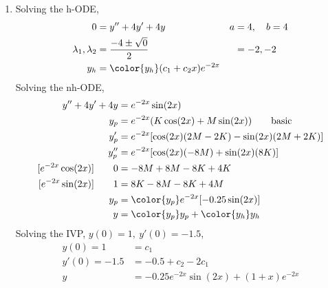 \begin{enumerate}
    \item Solving the h-ODE,
          \begin{align}
              0                        & = y'' + 4y' + 4y                      &
              a                        & = 4, \quad b = 4                        \\
              \lambda_{1}, \lambda_{2} & = \frac{-4 \pm \sqrt{0}}{2}           &
                                       & = -2, -2                                \\
              y_{h}                    & = \color{y_h} (c_{1} + c_{2}x)e^{-2x}
          \end{align}
          Solving the nh-ODE,
          \begin{align}
              y'' + 4y' + 4y             & = e^{-2x}\sin(2x)                    \\
              y_{p}                      & = e^{-2x}(K\cos(2x) + M\sin(2x))
              \qquad \text{basic}                                               \\
              y_{p}'                     & = e^{-2x}[\cos(2x)(2M - 2K)
              - \sin(2x)(2M + 2K)]                                              \\
              y_{p}''                    & = e^{-2x}[\cos(2x)(-8M)
              + \sin(2x)(8K)]                                                   \\
              [e^{-2x}\cos(2x)] \qquad 0 & =  -8M + 8M - 8K + 4K                \\
              [e^{-2x}\sin(2x)] \qquad 1 & = 8K - 8M - 8K + 4M                  \\
              y_{p}                      & = \color{y_p} e^{-2x}[-0.25\sin(2x)] \\
              y                          & = {\color{y_p} y_{p}}
              + {\color{y_h} y_{h}}
          \end{align}
          Solving the IVP, $ y(0) = 1,\ y'(0) = -1.5 $,
          \begin{align}
              y(0) = 1     & = c_{1}                               \\
              y'(0) = -1.5 & = -0.5 + c_{2} - 2c_{1}               \\
              y            & = -0.25e^{-2x}\sin(2x) + (1+x)e^{-2x}
          \end{align}


\end{enumerate}
